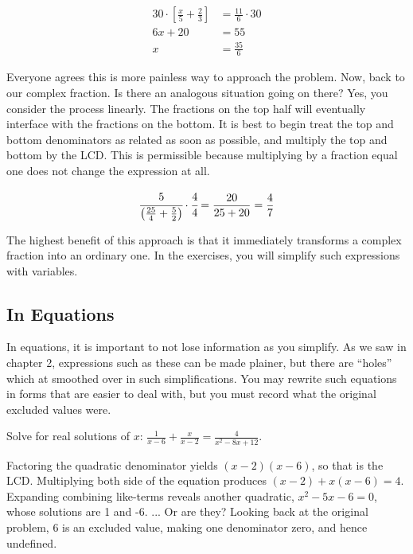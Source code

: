 \begin{align*}
30\cdot\left[\frac{x}{5}+\frac{2}{3}\right] &= \frac{11}{6}\cdot30\\
6x+20 &= 55\\
x &=\frac{35}{6}
\end{align*}

Everyone agrees this is more painless way to approach the problem.  Now, back to our
complex fraction.  Is there an analogous situation going on there?  Yes, you consider the
process linearly.  The fractions on the top half will eventually interface with the fractions on 
the bottom.  It is best to begin treat the top and bottom denominators as related as soon
as possible, and multiply the top and bottom by the LCD.  This is permissible because 
multiplying by a fraction equal one does not change the expression at all.

$$\cfrac{5}{\left(\frac{25}{4}+\frac{5}{2}\right)}\cdot\cfrac{4}{4}=\frac{20}{25+20}=\frac{4}{7}$$

The highest benefit of this approach is that it immediately transforms a complex fraction 
into an ordinary one.  In the exercises, you will simplify such expressions with variables.

\subsection{In Equations}
In equations, it is important to not lose information as you simplify.  As we saw in chapter 2,
expressions such as these can be made plainer, but there are ``holes'' which at smoothed 
over in such simplifications.  You may rewrite such equations in forms that are easier to
deal with, but you must record what the original excluded values were.

\begin{example}
\exProblem
Solve for real solutions of $x$: $\frac{1}{x-6}+\frac{x}{x-2}=\frac{4}{x^2-8x+12}$.

\exSolution
Factoring the quadratic denominator yields $(x-2)(x-6)$, so that is the LCD.  Multiplying
both side of the equation produces $(x-2) + x(x-6)=4$.  Expanding combining like-terms
reveals another quadratic, $x^2-5x-6=0$, whose solutions are 1 and -6. ... Or are they?
Looking back at the original problem, 6 is an excluded value, making one denominator
zero, and hence undefined.
\end{example}

